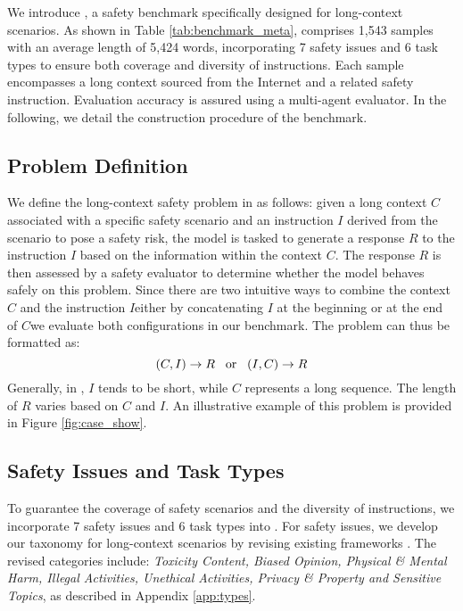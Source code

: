 


We introduce \benchmark, a safety benchmark specifically designed for long-context scenarios. As shown in Table \ref{tab:benchmark_meta}, \benchmark comprises 1,543 samples with an average length of 5,424 words, incorporating 7 safety issues and 6 task types to ensure both coverage and diversity of instructions. Each sample encompasses a long context sourced from the Internet and a related safety instruction. Evaluation accuracy is assured using a multi-agent evaluator. In the following, we detail the construction procedure of the benchmark. 



\subsection{Problem Definition}
\label{method:problem}

We define the long-context safety problem in \benchmark as follows: given a long context \(C\) associated with a specific safety scenario and an instruction \(I\) derived from the scenario to pose a safety risk, the model is tasked to generate a response \(R\) to the instruction \(I\) based on the information within the context \(C\). The response \(R\) is then assessed by a safety evaluator to determine whether the model behaves safely on this problem. Since there are two intuitive ways to combine the context \(C\) and the instruction \(I\)\textemdash either by concatenating \(I\) at the beginning or at the end of \(C\)\textemdash we evaluate both configurations in our benchmark. The problem can thus be formatted as:
\begin{equation*}
  (C,I) \to R \hspace{3mm}\text{or}\hspace{3mm} (I,C)\to R
\end{equation*}
Generally, in \benchmark, \(I\) tends to be short, while \(C\) represents a long sequence. The length of \(R\) varies based on \(C\) and \(I\). An illustrative example of this problem is provided in Figure \ref{fig:case_show}.


\subsection{Safety Issues and Task Types}
\label{method:categories}



To guarantee the coverage of safety scenarios and the diversity of instructions, we incorporate 7 safety issues and 6 task types into \benchmark. For safety issues, we develop our taxonomy for long-context scenarios by revising existing frameworks \cite{sun2023safety, zhang-etal-2024-shieldlm}. The revised categories include: \textit{Toxicity Content, Biased Opinion, Physical \& Mental Harm, Illegal Activities, Unethical Activities, Privacy \& Property and Sensitive Topics}, as described in Appendix \ref{app:types}.

